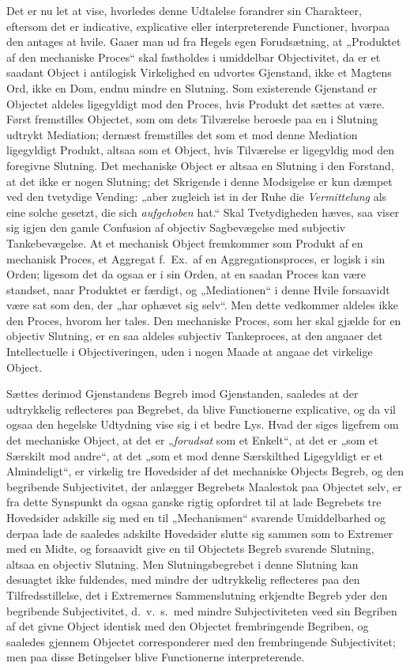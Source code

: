 \documentclass[12pt]{book}
\newcommand{\opage}[1]{\marginnote{\footnotesize\textit{[#1]}}}
\begin{document}
Det er nu let at vise, hvorledes denne Udtalelse forandrer sin Charakteer, eftersom det er indicative, explicative eller interpreterende Functioner, hvorpaa den antages at hvile. Gaaer man ud fra Hegels egen Forudsætning, at „Produktet af den mechaniske Proces“ skal fastholdes i umiddelbar Objectivitet, da er et saadant Object i antilogisk Virkelighed en udvortes Gjenstand, ikke et Magtens Ord, ikke en Dom, endnu mindre en Slutning. Som existerende Gjenstand er Objectet aldeles ligegyldigt mod den Proces, hvis Produkt det sættes at være. Først fremstilles Objectet, som om dets Tilværelse beroede paa en i Slutning udtrykt Mediation; dernæst fremstilles det som et mod denne Mediation ligegyldigt Produkt, altsaa som et Object, hvis Tilværelse er ligegyldig mod den foregivne Slutning. Det mechaniske Object er altsaa en Slutning i den Forstand, at det ikke er nogen Slutning; det Skrigende i denne Modsigelse er kun dæmpet ved den tvetydige Vending: „aber zugleich ist in der Ruhe die \emph{Vermittelung} als eine solche gesetzt, die sich \emph{aufgehoben} hat.“ Skal Tvetydigheden hæves, saa viser sig igjen den gamle Confusion af objectiv Sagbevægelse med subjectiv Tankebevægelse. At et mechanisk Object fremkommer som Produkt af en mechanisk Proces, et Aggregat f.\ Ex.\ af en Aggregationsproces, er logisk i sin Orden; ligesom det da ogsaa er i sin Orden, at en saadan Proces kan være standset, naar Produktet er færdigt, og „Mediationen“ i denne Hvile forsaavidt være sat som den, der „har ophævet sig selv“. Men dette vedkommer aldeles ikke den Proces, hvorom her tales. Den mechaniske
\opage{387}Proces, som her skal gjælde for en objectiv Slutning, er en saa aldeles subjectiv Tankeproces, at den angaaer det Intellectuelle i Objectiveringen, uden i nogen Maade at angaae det virkelige Object.

Sættes derimod Gjenstandens Begreb imod Gjenstanden, saaledes at der udtrykkelig reflecteres paa Begrebet, da blive Functionerne explicative, og da vil ogsaa den hegelske Udtydning vise sig i et bedre Lys. Hvad der siges ligefrem om det mechaniske Object, at det er „\emph{forudsat} som et Enkelt“, at det er „som et Særskilt mod andre“, at det „som et mod denne Særskilthed Ligegyldigt er et Almindeligt“, er virkelig tre Hovedsider af det mechaniske Objects Begreb, og den begribende Subjectivitet, der anlægger Begrebets Maalestok paa Objectet selv, er fra dette Synspunkt da ogsaa ganske rigtig opfordret til at lade Begrebets tre Hovedsider adskille sig med en til „Mechanismen“ svarende Umiddelbarhed og derpaa lade de saaledes adskilte Hovedsider slutte sig sammen som to Extremer med en Midte, og forsaavidt give en til Objectets Begreb svarende Slutning, altsaa en objectiv Slutning. Men Slutningsbegrebet i denne Slutning kan desuagtet ikke fuldendes, med mindre der udtrykkelig reflecteres paa den Tilfredsstillelse, det i Extremernes Sammenslutning erkjendte Begreb yder den begribende Subjectivitet, d.\ v.\ s.\ med mindre Subjectiviteten veed sin Begriben af det givne Object identisk med den Objectet frembringende Begriben, og saaledes gjennem Objectet corresponderer med den frembringende Subjectivitet; men paa disse Betingelser blive Functionerne interpreterende.
\end{document}
